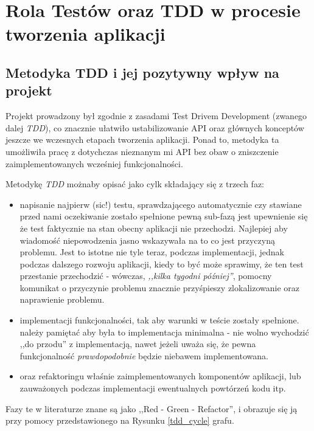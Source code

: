 \documentclass[pdflatex,11pt]{aghdpl}
\begin{document}
\newpage
\chapter{Rola Testów oraz TDD w procesie tworzenia aplikacji}
\label{chapter:tdd}
\section{Metodyka TDD i jej pozytywny wpływ na projekt}

Projekt prowadzony był zgodnie z zasadami Test Drivem Development (zwanego dalej \textit{TDD}),
co znacznie ułatwiło ustabilizowanie API oraz głównych konceptów jeszcze we wczesnych etapach tworzenia aplikacji.
Ponad to, metodyka ta umożliwiła pracę z dotychczas nieznanym mi API bez obaw o zniszczenie zaimplementowanych wcześniej funkcjonalności.

Metodykę \textit{TDD} możnaby opisać jako cylk składający się z trzech faz:
\begin{itemize}
 \item napisanie najpierw \small{(sic!)} testu, sprawdzającego automatycznie czy stawiane przed nami oczekiwanie zostało spełnione
 \subitem pewną sub-fazą jest upewnienie się że test faktycznie na stan obecny aplikacji nie przechodzi. Najlepiej aby wiadomość niepowodzenia
          jasno wskazywała na to co jest przyczyną problemu. Jest to istotne nie tyle teraz, podczas implementacji, jednak podczas dalszego rozwoju aplikacji,
          kiedy to być może sprawimy, że ten test przestanie przechodzić - wówczas, \textit{,,kilka tygodni później''}, pomocny komunikat o przyczynie problemu 
          znacznie przyśpieszy zlokalizowanie oraz naprawienie problemu.
 \item implementacji funkcjonalności, tak aby warunki w teście zostały spełnione.
  \subitem należy pamiętać aby była to implementacja minimalna - nie wolno wychodzić ,,do przodu'' z implementacją, nawet jeżeli uważa się,
           że pewna funkcjonalność \textit{prawdopodobnie} będzie niebawem implementowana.
 \item oraz refaktoringu właśnie zaimplementowanych komponentów aplikacji, lub zauważonych podczas implementacji ewentualnych powtórzeń kodu itp.
\end{itemize}

Fazy te w literaturze znane są jako ,,Red - Green - Refactor'', i obrazuje się ją przy pomocy przedstawionego na Rysunku \ref{tdd_cycle} grafu.
\end{document}

